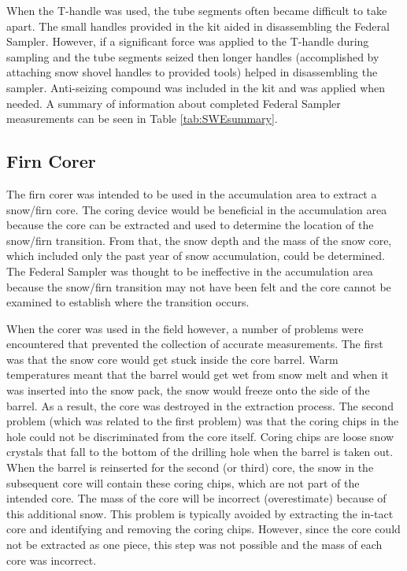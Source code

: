 \documentclass{sfuthesis}
\begin{document}
When the T-handle was used, the tube segments often became difficult to take apart. The small handles provided in the kit aided in disassembling the Federal Sampler. However, if a significant force was applied to the T-handle during sampling and the tube segments seized then longer handles (accomplished by attaching snow shovel handles to provided tools) helped in disassembling the sampler. Anti-seizing compound was included in the kit and was applied when needed. A summary of information about completed Federal Sampler measurements can be seen in Table \ref{tab:SWEsummary}.

\subsection{Firn Corer}

The firn corer was intended to be used in the accumulation area to extract a snow/firn core. The coring device would be beneficial in the accumulation area because the core can be extracted and used to determine the location of the snow/firn transition. From that, the snow depth and the mass of the snow core, which included only the past year of snow accumulation, could be determined. The Federal Sampler was thought to be ineffective in the accumulation area because the snow/firn transition may not have been felt and the core cannot be examined to establish where the transition occurs.

When the corer was used in the field however, a number of problems were encountered that prevented the collection of accurate measurements. The first was that the snow core would get stuck inside the core barrel. Warm temperatures meant that the barrel would get wet from snow melt and when it was inserted into the snow pack, the snow would freeze onto the side of the barrel. As a result, the core was destroyed in the extraction process. The second problem (which was related to the first problem) was that the coring chips in the hole could not be discriminated from the core itself. Coring chips are loose snow crystals that fall to the bottom of the drilling hole when the barrel is taken out. When the barrel is reinserted for the second (or third) core, the snow in the subsequent core will contain these coring chips, which are not part of the intended core. The mass of the core will be incorrect (overestimate) because of this additional snow. This problem is typically avoided by extracting the in-tact core and identifying and removing the coring chips. However, since the core could not be extracted as one piece, this step was not possible and the mass of each core was incorrect. 
\end{document}
